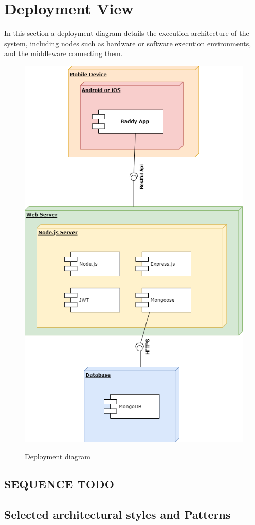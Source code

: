 \documentclass[../../dd.tex]{subfiles}
\begin{document}
    \newpage
    \section{Deployment View}
    In this section a deployment diagram details the execution architecture of the system, including nodes such as hardware or software execution environments, and the middleware connecting them.
    
    \begin{figure}[H]
        \centering
        \includegraphics[scale=0.5]{assets/deployment2.png}\\[1.6 cm]
        \caption[\textit{Deployment} Diagram]{ Deployment diagram}
    \end{figure}
    
    
    \subsection{SEQUENCE TODO}
    
    
    \subsection{Selected architectural styles and Patterns}
\end{document}
